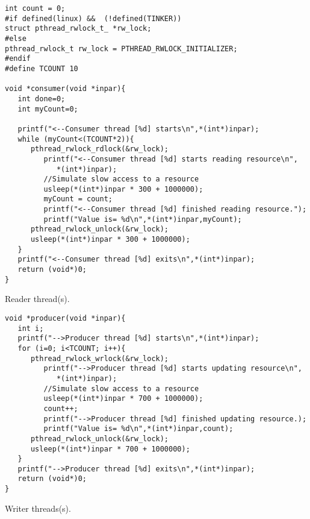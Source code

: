 \begin{table}[!hbp]
\begin{verbatim}
int count = 0;
#if defined(linux) &&  (!defined(TINKER))
struct pthread_rwlock_t_ *rw_lock;
#else
pthread_rwlock_t rw_lock = PTHREAD_RWLOCK_INITIALIZER;
#endif
#define TCOUNT 10

void *consumer(void *inpar){
   int done=0;
   int myCount=0;

   printf("<--Consumer thread [%d] starts\n",*(int*)inpar);
   while (myCount<(TCOUNT*2)){
      pthread_rwlock_rdlock(&rw_lock);
         printf("<--Consumer thread [%d] starts reading resource\n",
            *(int*)inpar);
         //Simulate slow access to a resource
         usleep(*(int*)inpar * 300 + 1000000);
         myCount = count;
         printf("<--Consumer thread [%d] finished reading resource.");
         printf("Value is= %d\n",*(int*)inpar,myCount);
      pthread_rwlock_unlock(&rw_lock);
      usleep(*(int*)inpar * 300 + 1000000);
   }
   printf("<--Consumer thread [%d] exits\n",*(int*)inpar);
   return (void*)0;
}

\end{verbatim}
\caption{Reader thread(s).\label{rwl_threads1}}
\end{table}

\begin{table}[!hbp]
\begin{verbatim}
void *producer(void *inpar){
   int i;
   printf("-->Producer thread [%d] starts\n",*(int*)inpar);
   for (i=0; i<TCOUNT; i++){
      pthread_rwlock_wrlock(&rw_lock);
         printf("-->Producer thread [%d] starts updating resource\n",
            *(int*)inpar);
         //Simulate slow access to a resource
         usleep(*(int*)inpar * 700 + 1000000); 
         count++;
         printf("-->Producer thread [%d] finished updating resource.); 
         printf("Value is= %d\n",*(int*)inpar,count);
      pthread_rwlock_unlock(&rw_lock);
      usleep(*(int*)inpar * 700 + 1000000);
   }
   printf("-->Producer thread [%d] exits\n",*(int*)inpar);
   return (void*)0;
} 

\end{verbatim}
\caption{Writer threads(s).\label{rwl_threads2}}
\end{table}


